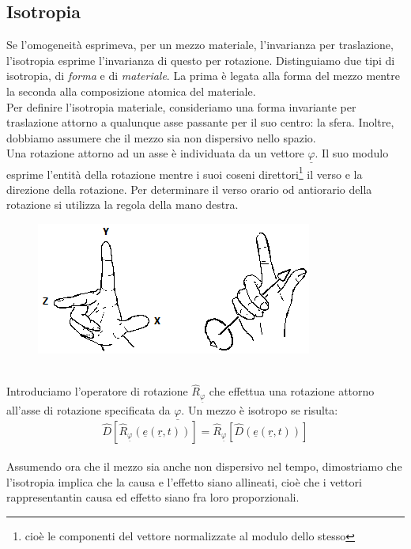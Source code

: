 \documentclass{book}
\begin{document}
        \subsection{Isotropia}
            Se l'omogeneità esprimeva, per un mezzo materiale, l'invarianza per traslazione, l'isotropia esprime l'invarianza di questo per rotazione. Distinguiamo due tipi di isotropia, di \textit{forma} e di \textit{materiale}. La prima è legata alla forma del mezzo mentre la seconda alla composizione atomica del materiale. \\
            Per definire l'isotropia materiale, consideriamo una forma invariante per traslazione attorno a qualunque asse passante per il suo centro: la sfera. Inoltre, dobbiamo assumere che il mezzo sia non dispersivo nello spazio. \\
            Una rotazione attorno ad un asse è individuata da un vettore $\underline{\varphi}$. Il suo modulo esprime l'entità della rotazione mentre i suoi coseni direttori\footnote{cioè le componenti del vettore normalizzate al modulo dello stesso} il verso e la direzione della rotazione. Per determinare il verso orario od antiorario della rotazione si utilizza la regola della mano destra.
            \begin{figure}[h!]
                \centering
                \includegraphics[width=0.5\linewidth]{img//Chapter_one/chaptOneManoDestra.png}
            \end{figure}
            \\
            Introduciamo l'operatore di rotazione $\hat{R}_{\underline{\varphi}}$ che effettua una rotazione attorno all'asse di rotazione specificata da $\underline{\varphi}$. Un mezzo è isotropo se risulta:
            \begin{equation}
                \hat{D}[\hat{R}_{\underline{\varphi}}(\underline{e}(\underline{r}, t))] = \hat{R}_{\underline{\varphi}}[\hat{D}(\underline{e}(\underline{r}, t))]  
            \end{equation}
            \\
            Assumendo ora che il mezzo sia anche non dispersivo nel tempo, dimostriamo che l'isotropia implica che la causa e l'effetto siano allineati, cioè che i vettori rappresentantin causa ed effetto siano fra loro proporzionali. \\
\end{document}
